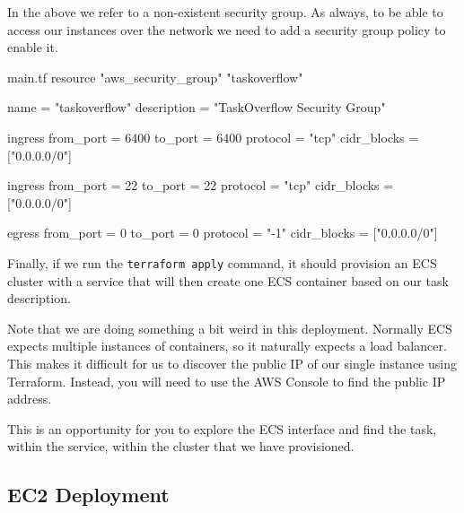 \documentclass{csse4400}
\begin{document}
In the above we refer to a non-existent security group.
As always, to be able to access our instances over the network we need to add a security group policy to enable it.

\begin{code}[language=terraform,numbers=none]{main.tf}
resource "aws_security_group" "taskoverflow" {
    name = "taskoverflow"
    description = "TaskOverflow Security Group"
  
    ingress {
      from_port = 6400
      to_port = 6400
      protocol = "tcp"
      cidr_blocks = ["0.0.0.0/0"]
    }
  
    ingress {
      from_port = 22
      to_port = 22
      protocol = "tcp"
      cidr_blocks = ["0.0.0.0/0"]
    }
  
    egress {
      from_port = 0
      to_port = 0
      protocol = "-1"
      cidr_blocks = ["0.0.0.0/0"]
    }
}
\end{code}

Finally, if we run the \texttt{terraform apply} command,
it should provision an ECS cluster with a service that will then create one ECS container based on our task description.

Note that we are doing something a bit weird in this deployment.
Normally ECS expects multiple instances of containers,
so it naturally expects a load balancer.
This makes it difficult for us to discover the public IP of our single instance using Terraform.
Instead, you will need to use the AWS Console to find the public IP address.

This is an opportunity for you to explore the ECS interface and find the task, within the service, within the cluster that we have provisioned.



\subsection{EC2 Deployment}

\end{document}
